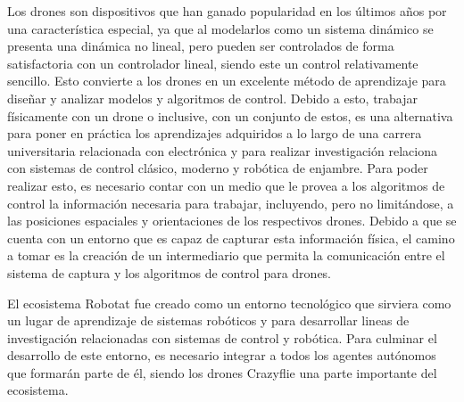 Los drones son dispositivos que han ganado popularidad en los últimos años por una característica especial, ya que al modelarlos como un sistema dinámico se presenta una dinámica no lineal, pero pueden ser controlados de forma satisfactoria con un controlador lineal, siendo este un control relativamente sencillo. Esto convierte a los drones en un excelente método de aprendizaje para diseñar y analizar modelos y algoritmos de control. Debido a esto, trabajar físicamente con un drone o inclusive, con un conjunto de estos, es una alternativa para poner en práctica los aprendizajes adquiridos a lo largo de una carrera universitaria relacionada con electrónica y para realizar investigación relaciona con sistemas de control clásico, moderno y robótica de enjambre. Para poder realizar esto, es necesario contar con un medio que le provea a los algoritmos de control la información necesaria para trabajar, incluyendo, pero no limitándose, a las posiciones espaciales y orientaciones de los respectivos drones. Debido a que se cuenta con un entorno que es capaz de capturar esta información física, el camino a tomar es la creación de un intermediario que permita la comunicación entre el sistema de captura y los algoritmos de control para drones.

El ecosistema Robotat fue creado como un entorno tecnológico que sirviera como un lugar de aprendizaje de sistemas robóticos y para desarrollar lineas de investigación relacionadas con sistemas de control y robótica. Para culminar el desarrollo de este entorno, es necesario integrar a todos los agentes autónomos que formarán parte de él, siendo los drones Crazyflie una parte importante del ecosistema. 